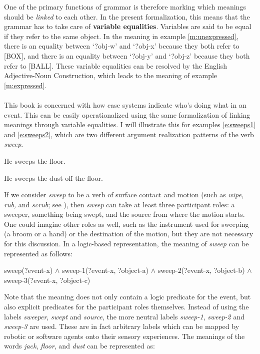 One of the primary functions of grammar is therefore marking which meanings should be {\em linked} to each other. In the present formalization, this means that the grammar has to take care of {\bfseries variable equalities}. Variables are said to be equal if they refer to the same object. In the meaning in example \ref{m:unexpressed}, there is an equality between `?obj-w' and `?obj-x' because they both refer to [BOX], and there is an equality between `?obj-y' and `?obj-z' because they both refer to [BALL]. These variable equalities can be resolved by the English Adjective-Noun Construction, which leads to the meaning of example \ref{m:expressed}.
\\
\\
 This book is concerned with how case systems indicate who's doing what in an event. This can be easily operationalized using the same formalization of linking meanings through variable equalities. I will illustrate this for examples \ref{e:sweeps1} and \ref{e:sweeps2}, which are two different argument realization patterns of the verb {\em sweep}.

\ea
\label{e:sweeps1}
He sweeps the floor.
\item 
\label{e:sweeps2}
He sweeps the dust off the floor.
\z

If we consider {\em sweep} to be a verb of surface contact and motion (such as {\em wipe, rub,} and {\em scrub}; see \citealp{levin99two}), then {\em sweep} can take at least three participant roles: a sweeper, something being swept, and the source from where the motion starts. One could imagine other roles as well, such as the instrument used for sweeping (a broom or a hand) or the destination of the motion, but they are not necessary for this discussion. In a logic-based representation, the meaning of {\em sweep} can be represented as follows:

\ea
sweep(?event-x) $\wedge$ sweep-1(?event-x, ?object-a) $\wedge$ sweep-2(?event-x, ?object-b) $\wedge$ sweep-3(?event-x, ?object-c)
\z

Note that the meaning does not only contain a logic predicate for the event, but also explicit predicates for the participant roles themselves. Instead of using the labels {\em sweeper}, {\em swept} and {\em source}, the more neutral labels {\em sweep-1}, {\em sweep-2} and {\em sweep-3} are used. These are in fact arbitrary labels which can be mapped by robotic or software agents onto their sensory experiences. The meanings of the words {\em jack}, {\em floor}, and {\em dust} can be represented as:

